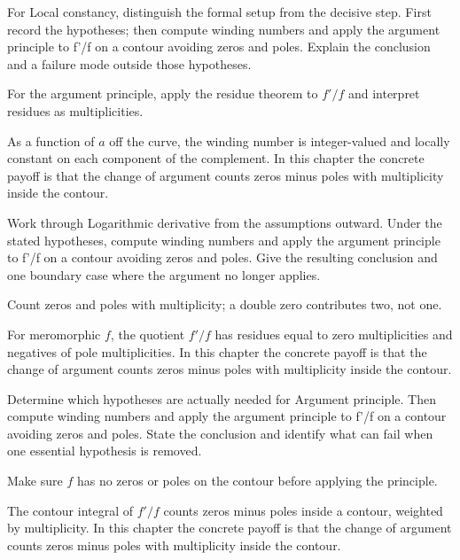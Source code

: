 \begin{exercise}\label{exr:iv12-03}
For Local constancy, distinguish the formal setup from the decisive step. First record the hypotheses; then compute winding numbers and apply the argument principle to f'/f on a contour avoiding zeros and poles. Explain the conclusion and a failure mode outside those hypotheses.
\end{exercise}
\begin{hint}
For the argument principle, apply the residue theorem to \(f'/f\) and interpret residues as multiplicities.
\end{hint}
\begin{solution}
As a function of $a$ off the curve, the winding number is integer-valued and locally constant on each component of the complement. In this chapter the concrete payoff is that the change of argument counts zeros minus poles with multiplicity inside the contour.
\end{solution}

\begin{exercise}\label{exr:iv12-04}
Work through Logarithmic derivative from the assumptions outward. Under the stated hypotheses, compute winding numbers and apply the argument principle to f'/f on a contour avoiding zeros and poles. Give the resulting conclusion and one boundary case where the argument no longer applies.
\end{exercise}
\begin{hint}
Count zeros and poles with multiplicity; a double zero contributes two, not one.
\end{hint}
\begin{solution}
For meromorphic $f$, the quotient $f'/f$ has residues equal to zero multiplicities and negatives of pole multiplicities. In this chapter the concrete payoff is that the change of argument counts zeros minus poles with multiplicity inside the contour.
\end{solution}

\begin{exercise}\label{exr:iv12-05}
Determine which hypotheses are actually needed for Argument principle. Then compute winding numbers and apply the argument principle to f'/f on a contour avoiding zeros and poles. State the conclusion and identify what can fail when one essential hypothesis is removed.
\end{exercise}
\begin{hint}
Make sure \(f\) has no zeros or poles on the contour before applying the principle.
\end{hint}
\begin{solution}
The contour integral of $f'/f$ counts zeros minus poles inside a contour, weighted by multiplicity. In this chapter the concrete payoff is that the change of argument counts zeros minus poles with multiplicity inside the contour.
\end{solution}

